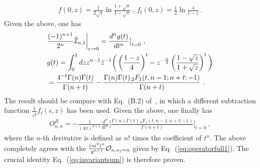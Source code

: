 \documentclass[a4paper,11pt]{article}
\begin{document}
\begin{align}
f(0,z)=\frac{1}{2\sqrt{z}}\ln \frac{1+\sqrt{z}}{1-\sqrt{z}} \ ,  \ 
f_t(0,z)=\frac{1}{2}\ln \frac{4}{1-z} \ .
\end{align}
Given the above, one has
\begin{align}
&\frac{(-1)^{n+1}}{2^n}\hat {\cal I}_{n,1}\bigg|_{\epsilon\rightarrow0}=\frac{d^ng(t)}{dt^n}\big|_{t=0} \ , \\
&g(t)=\int_0^1 dz z^{n-1}\bar z^{-1}\bigg(\left(\frac{1-z}{4}\right)^t-z^{-\frac{n}{2}}\left(\frac{1-\sqrt{z}}{1+\sqrt{z}}\right)^t\bigg) \nonumber \\ 
&=\frac{4^{-t}\Gamma(n)\Gamma(t)}{\Gamma(n+t)}-\frac{\Gamma (n) \Gamma (t) \, _2{F}_1(t,n-1;n+t;-1)}{\Gamma(n+t)} \ .
\end{align}
The result should be compare with Eq.~(B.2) of~\cite{Marino:2021six}, in which a different subtraction function $\frac{1}{z^{\frac{1}{2}}}f_t(\epsilon,z)$ has been used. Given the above, one finally has
\begin{align}
O_{n,n}^B=-\frac{1}{(4\pi)^{n+1}}\frac{d^n}{dt^n}\bigg[\frac{\Gamma (n) \Gamma (t) \, _2{F}_1(t,n-1;n+t;-1)}{\Gamma(n+t)}\bigg]_{t=0} \ ,
\end{align}
where the $n$-th derivative is defined as $n!$ times the coefficient of $t^n$. 
The above completely agrees with the $\frac{(m^2)^n}{g^{n+1}}{\cal O}_{n,s_1=n}$ given by Eq.~(\ref{eq:operatorfull1}). The crucial identity Eq.~(\ref{eq:invariantsum}) is therefore proven.
\end{document}
